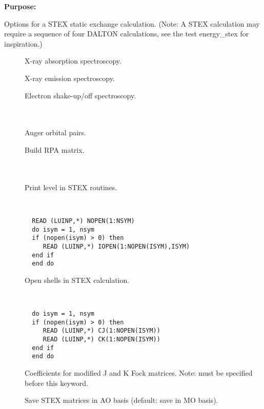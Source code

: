{\bf Purpose:}

Options for a STEX static exchange calculation.
(Note: A STEX calculation may require a sequence of four DALTON calculations, see the test energy\_stex for inspiration.)

\begin{description}
\item[]
X-ray absorption spectroscopy.

\item[]
X-ray emission spectroscopy.

\item[]
Electron shake-up/off spectroscopy.

\item[] \ \\
   \\
Auger orbital pairs.

\item[]
Build RPA matrix.

\item[] \ \\
   \\
Print level in STEX routines.

\item[] \ 
\begin{verbatim}
  READ (LUINP,*) NOPEN(1:NSYM)
  do isym = 1, nsym
  if (nopen(isym) > 0) then
     READ (LUINP,*) IOPEN(1:NOPEN(ISYM),ISYM)
  end if
  end do
\end{verbatim}
  Open shells in STEX calculation.

\item[] \ 
\begin{verbatim}
  do isym = 1, nsym
  if (nopen(isym) > 0) then
     READ (LUINP,*) CJ(1:NOPEN(ISYM))
     READ (LUINP,*) CK(1:NOPEN(ISYM))
  end if
  end do
\end{verbatim}
  Coefficients for modified J and K Fock matrices.
  Note:  must be specified before this keyword.

\item[]
  Save STEX matrices in AO basis (default: save in MO basis).

\end{description}


\pagebreak[3]
\subsection{\label{ref-solinp}}

